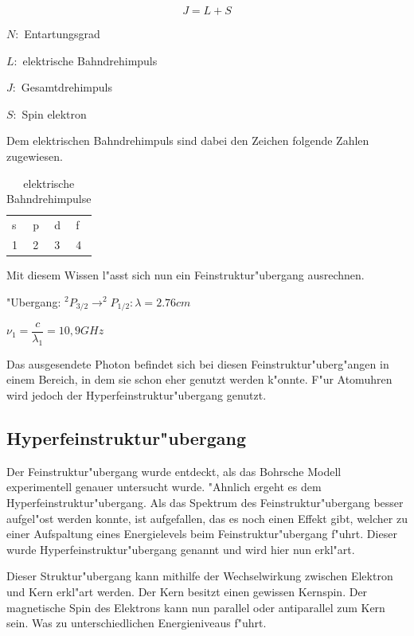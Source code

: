\begin{refsection}
\begin{equation}
	J = L + S
\end{equation}

$N:$ Entartungsgrad

$L:$ elektrische Bahndrehimpuls

$J:$ Gesamtdrehimpuls

$S:$ Spin elektron

Dem elektrischen Bahndrehimpuls sind dabei den Zeichen folgende Zahlen zugewiesen.

\begin{table}
	\centering	
	\begin{tabular}{llll}
		s & p & d & f \\
		1 & 2 & 3 & 4 \\
	\end{tabular}
	\caption{elektrische Bahndrehimpulse}
	\label{atomuhr:drehimpulsnotation}
\end{table}

Mit diesem Wissen l"asst sich nun ein Feinstruktur"ubergang ausrechnen. 
\begin{center}
		"Ubergang: $^2P_{3/2} \rightarrow ^2P_{1/2}: \lambda = 2.76cm$
		
		$\nu_1 = \dfrac{c}{\lambda_1} = 10,9 GHz $
\end{center}

Das ausgesendete Photon befindet sich bei diesen Feinstruktur"uberg"angen in einem Bereich, in dem sie schon eher genutzt werden k"onnte. F"ur Atomuhren wird jedoch der  Hyperfeinstruktur"ubergang genutzt. 

\subsection{Hyperfeinstruktur"ubergang}
Der Feinstruktur"ubergang wurde entdeckt, als das Bohrsche Modell experimentell genauer untersucht wurde. "Ahnlich ergeht es dem Hyperfeinstruktur"ubergang. Als das Spektrum des Feinstruktur"ubergang besser aufgel"ost werden konnte, ist aufgefallen, das es noch einen Effekt gibt, welcher zu einer Aufspaltung eines Energielevels beim Feinstruktur"ubergang f"uhrt. Dieser wurde Hyperfeinstruktur"ubergang genannt und wird hier nun erkl"art.

Dieser Struktur"ubergang kann mithilfe der Wechselwirkung zwischen Elektron und Kern erkl"art werden. Der Kern besitzt einen gewissen Kernspin. Der magnetische Spin des Elektrons kann nun parallel oder antiparallel zum Kern sein. Was zu unterschiedlichen Energieniveaus f"uhrt. 


\end{refsection}

